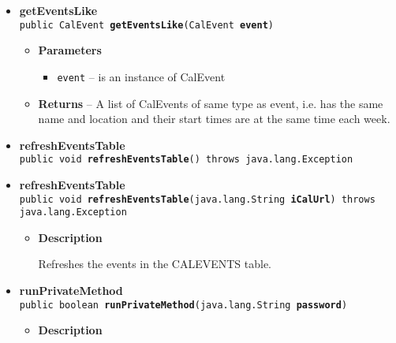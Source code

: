 \documentclass[11pt,a4paper]{report}
\begin{document}
{{{\begin{itemize}
{\begin{itemize}
{A function to get the color value of an event.
}
\item{
{\bf  Parameters}
  \begin{itemize}
   \item{
\texttt{name} -- The event name we want the color for.}
  \end{itemize}
}%
\item{{\bf  Returns} -- 
The color value of name or -1 in case of failure. 
}%
\end{itemize}
}%
\item{ 
{\bf  getEventsLike}\\
\texttt{public CalEvent\lbrack \rbrack \ {\bf  getEventsLike}(\texttt{CalEvent} {\bf  event})
\label{is.mpg.ruglan.data.Dabbi.getEventsLike(is.mpg.ruglan.data.CalEvent)}}%
\begin{itemize}
\item{
{\bf  Parameters}
  \begin{itemize}
   \item{
\texttt{event} -- is an instance of CalEvent}
  \end{itemize}
}%
\item{{\bf  Returns} -- 
A list of CalEvents of same type as event, i.e. has the same name and location and their start times are at the same time each week. 
}%
\end{itemize}
}%
\item{ 
{\bf  refreshEventsTable}\\
\texttt{public void\ {\bf  refreshEventsTable}() throws java.lang.Exception
\label{is.mpg.ruglan.data.Dabbi.refreshEventsTable()}}%
}%
\item{ 
{\bf  refreshEventsTable}\\
\texttt{public void\ {\bf  refreshEventsTable}(\texttt{java.lang.String} {\bf  iCalUrl}) throws java.lang.Exception
\label{is.mpg.ruglan.data.Dabbi.refreshEventsTable(java.lang.String)}}%
\begin{itemize}
\item{
{\bf  Description}

Refreshes the events in the CALEVENTS table.
}
\end{itemize}
}%
\item{ 
{\bf  runPrivateMethod}\\
\texttt{public boolean\ {\bf  runPrivateMethod}(\texttt{java.lang.String} {\bf  password})
\label{is.mpg.ruglan.data.Dabbi.runPrivateMethod(java.lang.String)}}%
\begin{itemize}
\item{
{\bf  Description}

}
\end{itemize}}
\end{itemize}}}}
\end{document}
